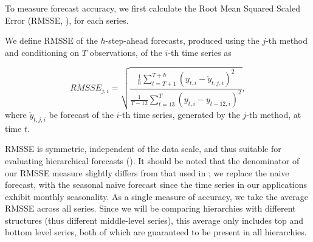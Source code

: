 \documentclass[a4paper,review,12pt,authoryear]{elsarticle}
\begin{document}
To measure forecast accuracy, we first calculate the Root Mean Squared Scaled Error (RMSSE, \citealp{makridakisM5AccuracyCompetition2022}), for each series. {\color{purple}We define RMSSE of the $h$-step-ahead forecasts, produced using the $j$-th method and conditioning on $T$ observations, of the $i$-th time series as

\[
RMSSE_{j, i} = \sqrt{\frac{\frac{1}{h}\displaystyle\sum_{t=T+1}^{T+h}(y_{t, i}-\breve y_{t, j, i})^2}{\frac{1}{T-12}\displaystyle\sum_{t=13}^T (y_{t, i} - y_{t-12, i})^2}},
\]
where $\breve y_{t,j,i}$ be forecast of the $i$-th time series, generated by the $j$-th method, at time $t$.} RMSSE is symmetric, independent of the data scale, and thus suitable for evaluating hierarchical forecasts (\citealp{athanasopoulosEvaluationHierarchicalForecasts2023}). It should be noted that the denominator of our RMSSE measure slightly differs from that used in \cite{makridakisM5AccuracyCompetition2022}; we replace the naive forecast, with the seasonal naive forecast since the time series in our applications exhibit monthly seasonality. 
As a single measure of accuracy, we take the average RMSSE across all series. Since we will be comparing hierarchies with different structures (thus different middle-level series), this average only includes top and bottom level series, both of which are guaranteed to be present in all hierarchies.

\end{document}
